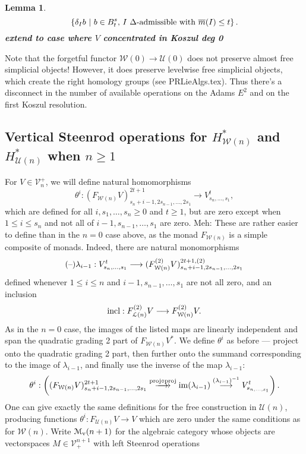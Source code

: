 \documentclass[11pt]{amsart}
\theoremstyle{plain}
\newtheorem{lem}[thm]{Lemma}
\theoremstyle{definition}
\DeclareMathOperator{\im}{im}
\newcommand{\DASH}{\textup{--}}
\renewcommand{\to}{\longrightarrow}
\newcommand{\calW}{\mathcal{W}}
\newcommand{\calU}{\mathcal{U}}
\newcommand{\calL}{\mathcal{L}}
\newcommand{\calV}{\mathcal{V}}
\newcommand{\calM}{\mathcal{M}}
\theoremstyle{plain}
\newcommand{\deltaalg}{\Delta} %
\newcommand{\vect}[2]{\calV^{#1}_{#2}}
\newcommand{\minDimP}{\overline{m}}
\begin{document}
\begin{Cohomology operations for all unstable Lie algebras}
\begin{lem}
\[\left\{\delta_Ib\ \middle|\ b\in B^{s}_t\textup{, $I$ $\deltaalg$-admissible with }\minDimP(I)\leq t\right\}.\]
\textbf{extend to case where $V$ concentrated in Koszul deg 0}\end{lem}
\begin{shaded}
Note that the forgetful functor $\calW(0)\to\calU(0)$ does not preserve almost free simplicial objects! However, it does preserve levelwise free simplicial objects, which create the right homology groups (see PRLieAlgs.tex). Thus there's a disconnect in the number of available operations on the Adams $E^2$ and on the first Koszul resolution.
\end{shaded}

\subsection{Vertical Steenrod operations for $H^*_{\calW(n)}$ and $H^*_{\calU(n)}$ when $n\geq1$}\label{section: vertical Koszul operations n positive}
For $V\in \vect{+}{n}$, we will define natural homomorphisms
\[\theta^i:(F_{\calW(n)}V)^{2t+1}_{s_n+i-1,2s_{n-1},\ldots,2s_1}\to V^{t}_{s_n,\ldots,s_1},\]
which are defined for all $i,s_1,\ldots,s_n\geq0$ and $t\geq1$, but are zero except when $1\leq i \leq s_n$ and not all of $i-1,s_{n-1},\ldots,s_1$ are zero.
{\tiny Meh: These are rather easier to define than in the $n=0$ case above, as the monad $F_{\calW(n)}$ is a simple composite of monads.}
Indeed, there are natural monomorphisms
\[(\DASH)\lambda_{i-1}:V^{t}_{s_n,\ldots,s_1}\to (F^{(2)}_{\calW(n)}V)^{2t+1,(2)}_{s_n+i-1,2s_{n-1},\ldots,2s_1}\]
defined whenever $1\leq i\leq n$ and $i-1,s_{n-1},\ldots,s_1$ are not all zero, and an inclusion
\[\textup{incl}:F^{(2)}_{\calL(n)}V\to F^{(2)}_{\calW(n)}V.\]
As in the $n=0$ case, the images of the listed maps are linearly independent and span the quadratic grading 2 part of $F_{\calW(n)}V^*$. We define $\theta^i$ as before --- project onto the quadratic grading 2 part, then further onto the summand corresponding to the image of $\lambda_{i-1}$, and finally use the inverse of the map $\lambda_{i-1}$:
\[\theta^i:\left((F_{\calW(n)}V)^{2t+1}_{s_n+i-1,2s_{n-1},\ldots,2s_1}\overset{\textup{proj}\circ\textup{proj}}{\makebox[.06ex][l]{$\to$}\to} \im (\lambda_{i-1})\overset{(\lambda_{i-1})^{-1}}{\to}V^{t}_{s_{n,\ldots,s_1}}\right).\]
One can give exactly the same definitions for the free construction in $\calU(n)$, producing functions $\theta^i:F_{\calU(n)}V\to V$ which are zero under the same conditions as for $\calW(n)$.
Write $\calM_\textup{v}(n+1)$ for the algebraic category whose objects are vectorspaces $M\in\vect{n+1}{+}$ with left Steenrod operations

\end{Cohomology operations for all unstable Lie algebras}
\end{document}

